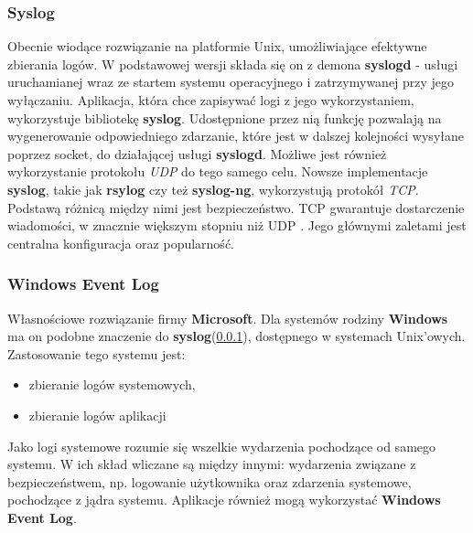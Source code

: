         \subsubsection{Syslog}
        \label{chapter:logs:collecting:source:syslog}
        Obecnie wiodące rozwiązanie na platformie Unix, umożliwiające efektywne zbierania logów. 
        W podstawowej wersji składa się on z demona \textbf{syslogd} - usługi
        uruchamianej wraz ze startem systemu operacyjnego i zatrzymywanej przy jego wyłączaniu. 
        Aplikacja, która chce zapisywać logi z jego wykorzystaniem, wykorzystuje bibliotekę \textbf{syslog}.
        Udostępnione przez nią funkcję pozwalają na wygenerowanie odpowiedniego zdarzanie, które jest
        w dalszej kolejności wysyłane poprzez socket, do działającej usługi \textbf{syslogd}. Możliwe jest
        również wykorzystanie protokołu \textit{UDP} do tego samego celu.
        Nowsze implementacje \textbf{syslog}, takie jak \textbf{rsylog} czy też \textbf{syslog-ng}, 
        wykorzystują protokół \textit{TCP}. Podstawą różnicą między nimi jest bezpieczeństwo. TCP
        gwarantuje dostarczenie wiadomości, w znacznie większym stopniu niż UDP \cite{logging_log_management}.
        Jego głównymi zaletami jest centralna konfiguracja oraz popularność.
        
        \subsubsection{Windows Event Log}
        \label{chapter:logs:collecting:source:windows_event_log}
        Własnościowe rozwiązanie firmy \textbf{Microsoft}. Dla systemów rodziny \textbf{Windows}
        ma on podobne znaczenie do \textbf{syslog}(\ref{chapter:logs:collecting:source:syslog}),
        dostępnego w systemach Unix'owych. Zastosowanie tego systemu jest:
        \begin{itemize}
            \item zbieranie logów systemowych,
            \item zbieranie logów aplikacji
        \end{itemize}
        Jako logi systemowe rozumie się wszelkie wydarzenia pochodzące od samego systemu. W ich skład
        wliczane są między innymi: wydarzenia związane z bezpieczeństwem, np. 
        logowanie użytkownika oraz zdarzenia systemowe, pochodzące z jądra systemu. Aplikacje
        również mogą wykorzystać \textbf{Windows Event Log}.
        
